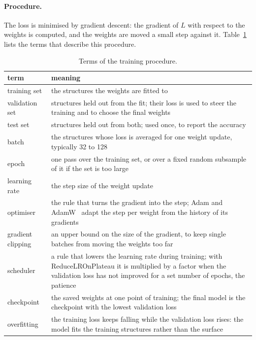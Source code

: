 \paragraph{Procedure.} The loss is minimised by gradient descent: the
gradient of $L$ with respect to the weights is computed, and the weights
are moved a small step against it. Table~\ref{tab:training-terms} lists
the terms that describe this procedure.

\begin{table}[h]
\centering
\small
\caption{Terms of the training procedure.}
\label{tab:training-terms}
\begin{tabular}{@{}l p{9.4cm}@{}}
\toprule
term & meaning \\
\midrule
training set & the structures the weights are fitted to \\
validation set & structures held out from the fit; their loss is used to
  steer the training and to choose the final weights \\
test set & structures held out from both; used once, to report the
  accuracy \\
\midrule
batch & the structures whose loss is averaged for one weight update,
  typically 32 to 128 \\
epoch & one pass over the training set, or over a fixed random subsample
  of it if the set is too large \\
learning rate & the step size of the weight update \\
optimiser & the rule that turns the gradient into the step; Adam and
  AdamW~\cite{kingma2015adam, loshchilov2019adamw} adapt the step per
  weight from the history of its gradients \\
gradient clipping & an upper bound on the size of the gradient, to keep
  single batches from moving the weights too far \\
scheduler & a rule that lowers the learning rate during training; with
  ReduceLROnPlateau it is multiplied by a factor when the validation loss
  has not improved for a set number of epochs, the patience \\
checkpoint & the saved weights at one point of training; the final model
  is the checkpoint with the lowest validation loss \\
overfitting & the training loss keeps falling while the validation loss
  rises: the model fits the training structures rather than the surface \\
\bottomrule
\end{tabular}
\end{table}

